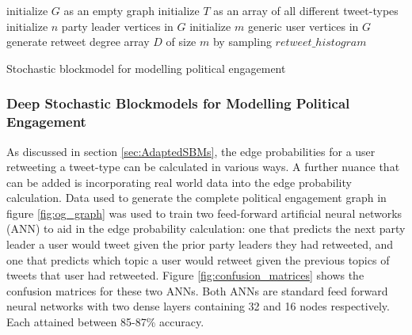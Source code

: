\begin{singlespacing}
\begin{algorithm}[H]
    \SetAlgoLined
    initialize $G$ as an empty graph\;
    initialize $T$ as an array of all different tweet-types\;
    initialize $n$ party leader vertices in $G$\;
    initialize $m$ generic user vertices in $G$\;
    generate retweet degree array $D$ of size $m$ by sampling $retweet\_histogram$\;
     \caption{Stochastic blockmodel for modelling political engagement}
     \label{algorithm:SBM}
\end{algorithm}
\end{singlespacing}


\subsubsection{Deep Stochastic Blockmodels for Modelling Political Engagement}\label{sec:DeepSBMs}

As discussed in section \ref{sec:AdaptedSBMs}, the edge probabilities for a user
retweeting a tweet-type can be calculated in various ways. A further nuance that
can be added is incorporating real world data into the edge probability
calculation. Data used to generate the complete political engagement graph in
figure \ref{fig:og_graph} was used to train two feed-forward artificial neural
networks (ANN) to aid in the edge probability calculation: one that predicts the
next party leader a user would tweet given the prior party leaders they had
retweeted, and one that predicts which topic a user would retweet given the
previous topics of tweets that user had retweeted. Figure
\ref{fig:confusion_matrices} shows the confusion matrices for these two ANNs.
Both ANNs are standard feed forward neural networks with two dense layers
containing 32 and 16 nodes respectively. Each attained between 85-87\% accuracy.

